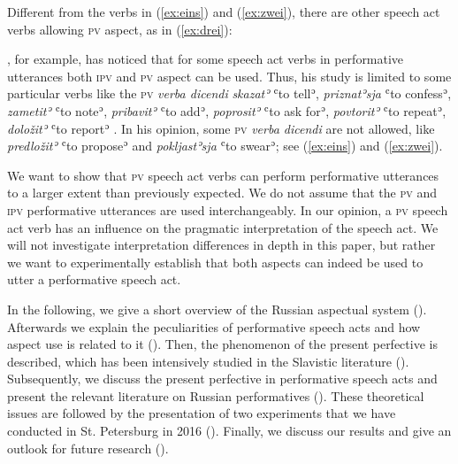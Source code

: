 \documentclass[output=paper,
colorlinks,
citecolor=brown,
newtxmath,
hidelinks
]{langscibook}
\begin{document}
\noindent Different from the verbs in (\ref{ex:eins}) and (\ref{ex:zwei}), there are other speech act verbs allowing \textsc{pv} aspect, as in (\ref{ex:drei}):

\ea\label{ex:drei}
            \z
\z

\noindent\citet{Dickey2000}, for example, has noticed that for some speech act verbs in performative utterances both \textsc{ipv} and \textsc{pv} aspect can be used. Thus, his study is limited to some particular verbs like the \textsc{pv} \textit{verba dicendi} \textit{skazatʾ} ʿto tellʾ, \textit{priznatʾsja} ʿto confessʾ, \textit{zametitʾ} ʿto noteʾ, \textit{pribavitʾ} ʿto addʾ, \textit{poprositʾ} ʿto ask forʾ, \textit{povtoritʾ} ʿto repeatʾ, \textit{doložitʾ} ʿto reportʾ \citep[179]{Dickey2000}. In his opinion, some \textsc{pv} \textit{verba dicendi} are not allowed, like \textit{predložitʾ} ʿto proposeʾ and \textit{pokljastʾsja} ʿto swearʾ; see (\ref{ex:eins}) and (\ref{ex:zwei}).

We want to show that \textsc{pv} speech act verbs can perform performative utterances to a larger extent than previously expected. We do not assume that the \textsc{pv} and \textsc{ipv} performative utterances are used interchangeably. In our opinion, a \textsc{pv} speech act verb has an influence on the pragmatic interpretation of the speech act. We will not investigate interpretation differences in depth in this paper, but rather we want to experimentally establish that both aspects can indeed be used to utter a performative speech act. 

In the following, we give a short overview of the Russian aspectual system (). Afterwards we explain the peculiarities of performative speech acts and how aspect use is related to it (). Then, the phenomenon of the present perfective is described, which has been intensively studied in the Slavistic literature (). Subsequently, we discuss the present perfective in performative speech acts and present the relevant literature on Russian performatives (). These theoretical issues are followed by the presentation of two experiments that we have conducted in St. Petersburg in 2016 (). Finally, we discuss our results and give an outlook for future research ().
\end{document}
